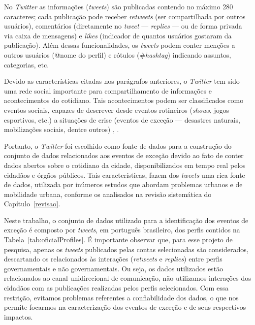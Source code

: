 \documentclass[
	12pt,				%
	oneside,			%
	a4paper,			%
	english,			%
	brazil				%
	]{abntex2ppgsi}
\begin{document}
{{%

No \textit{Twitter} as informações (\textit{tweets}) são publicadas contendo no máximo 280 caracteres; cada publicação pode receber \textit{retweets} (ser compartilhada por outros usuários), comentários (diretamente no \textit{tweet} --- \textit{replies} ---  ou de forma privada via caixa de mensagens) e \textit{likes} (indicador de quantos usuários gostaram da publicação). Além dessas funcionalidades, os \textit{tweets} podem conter menções a outros usuários (@nome do perfil) e rótulos (\#\textit{hashtag}) indicando assuntos, categorias, etc.

Devido as características citadas nos parágrafos anteriores, o \textit{Twitter} tem sido uma rede social importante para compartilhamento de informações e acontecimentos do cotidiano. Tais acontecimentos podem ser classificados como eventos sociais, capazes de descrever desde eventos rotineiros (\textit{shows}, jogos esportivos, etc.) a situações de crise (eventos de exceção --- desastres naturais, mobilizações sociais, dentre outros) \cite{zhou2014event}, \cite{atefeh2015survey}.
 
Portanto, o \textit{Twitter} foi escolhido como fonte de dados para a construção do conjunto de dados relacionados aos eventos de exceção devido ao fato de conter dados abertos sobre o cotidiano da cidade, disponibilizados em tempo real pelos cidadãos e órgãos públicos. Tais características, fazem dos \textit{tweets} uma rica fonte de dados, utilizada por inúmeros estudos que abordam problemas urbanos e de mobilidade urbana, conforme os analisados na revisão sistemática do Capítulo~\ref{revisao}.

Neste trabalho, o conjunto de dados utilizado para a identificação dos eventos de exceção é composto por \textit{tweets}, em português brasileiro, dos perfis contidos na Tabela~\ref{tab:oficialProfiles}. É importante observar que, para esse projeto de pesquisa, apenas os \textit{tweets} publicados pelas contas selecionadas são considerados, descartando os relacionados às interações (\textit{retweets} e \textit{replies}) entre perfis governamentais e não governamentais. Ou seja, os dados utilizados estão relacionados ao canal unidirecional de comunicação, não utilizamos interações dos cidadãos com as publicações realizadas pelos perfis selecionados. Com essa restrição, evitamos problemas referentes a confiabilidade dos dados, o que nos permite focarmos na caracterização dos eventos de exceção e de seus respectivos impactos.

}}
\end{document}
